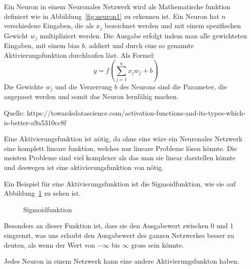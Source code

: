 \documentclass[12pt,a4paper]{report}
\begin{document}
Ein Neuron in einem Neuronales Netzwerk wird als Mathematische funktion definiert wie in Abbildung~\ref{fig:neuron1}
zu erkennen ist.
Ein Neuron hat $n$ verschiedene Eingaben, die als $x_j$ bezeichnet werden und mit einem spezifischen Gewicht $w_j$ multipliziert werden.
Die Ausgabe erfolgt indem man alle gewichteten Eingaben, mit einem bias $b$, addiert und durch eine so genannte
Aktivierungsfunktion durchlaufen läst.
Als Formel:
\[y =f\left(\sum_{j=1}^{n} x_j w_j + b\right)\]
Die Gewichte $w_j$ und die Verzerrung $b$ des Neurons sind die Parameter, die angepasst werden und somit das Neuron lernfähig machen.

Quelle: https://towardsdatascience.com/activation-functions-and-its-types-which-is-better-a9a5310cc8f

Eine Aktivierungsfunktion ist nötig, da ohne eine wäre ein Neuronales Netzwerk eine komplett lineare funktion, welches
nur lineare Probleme lösen könnte.
Die meisten Probleme sind viel komplexer als das man sie linear darstellen könnte und deswegen ist eine aktivierungsfunktion von nötig.

Ein Beispiel für eine Aktivierungsfunktion ist die Sigmoidfunktion, wie sie auf Abbildung~\ref{fig:activation1} zu sehen ist.
\begin{figure}[h]
    \centering
{}
    \caption{Sigmoidfunktion}
    \label{fig:activation1}
\end{figure}
Besonders an dieser Funktion ist, dass sie den Ausgabewert zwischen 0 und 1 eingrenzt, was uns erlaubt den Ausgabewert des ganzen
Netzwerkes besser zu deuten, als wenn der Wert von $-\infty$ bis $\infty$ gross sein könnte.

Jedes Neuron in einem Netzwerk kann eine andere Aktivierungsfunkton haben.
\end{document}
